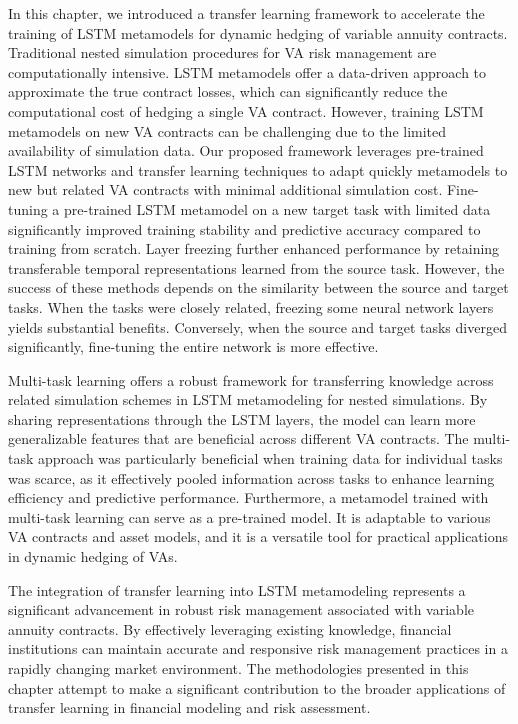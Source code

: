 In this chapter, we introduced a transfer learning framework to accelerate the training of LSTM metamodels for dynamic hedging of variable annuity contracts.
Traditional nested simulation procedures for VA risk management are computationally intensive.
LSTM metamodels offer a data-driven approach to approximate the true contract losses, which can significantly reduce the computational cost of hedging a single VA contract.
However, training LSTM metamodels on new VA contracts can be challenging due to the limited availability of simulation data.
Our proposed framework leverages pre-trained LSTM networks and transfer learning techniques to adapt quickly metamodels to new but related VA contracts with minimal additional simulation cost.
Fine-tuning a pre-trained LSTM metamodel on a new target task with limited data significantly improved training stability and predictive accuracy compared to training from scratch. 
Layer freezing further enhanced performance by retaining transferable temporal representations learned from the source task. 
However, the success of these methods depends on the similarity between the source and target tasks. 
When the tasks were closely related, freezing some neural network layers yields substantial benefits. 
Conversely, when the source and target tasks diverged significantly, fine-tuning the entire network is more effective.

Multi-task learning offers a robust framework for transferring knowledge across related simulation schemes in LSTM metamodeling for nested simulations. 
By sharing representations through the LSTM layers, the model can learn more generalizable features that are beneficial across different VA contracts. 
The multi-task approach was particularly beneficial when training data for individual tasks was scarce, as it effectively pooled information across tasks to enhance learning efficiency and predictive performance.
Furthermore, a metamodel trained with multi-task learning can serve as a pre-trained model. 
It is adaptable to various VA contracts and asset models, and it is a versatile tool for practical applications in dynamic hedging of VAs.

The integration of transfer learning into LSTM metamodeling represents a significant advancement in robust risk management associated with variable annuity contracts.
By effectively leveraging existing knowledge, financial institutions can maintain accurate and responsive risk management practices in a rapidly changing market environment. 
The methodologies presented in this chapter attempt to make a significant contribution to the broader applications of transfer learning in financial modeling and risk assessment.

